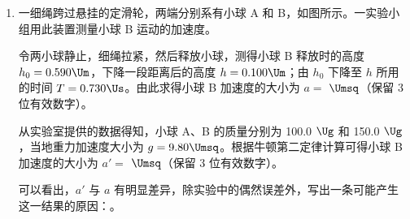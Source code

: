 \documentclass[\gkver]{gaokaozhenti}
\begin{document}
\begin{enumerate}
{$mv_{1}+m_{0}v_{0}=mv_{2}-m_{0}v_{0}$

解得 $v_{2}=\frac{3m_{0}}{m}v_{0}$

第 3 次推出后

$mv_{2}+m_{0}v_{0}=mv_{3}-m_{0}v_{0}$

解得 $v_{3}=\frac{5m_{0}}{m}v_{0}$

依次类推，第 8 次推出后，运动员的速度 $v_{8}=\frac{15m_{0}}{m}v_{0}$

根据题意可知 $v_{8}=\frac{15m_{0}}{m}v_{0}>5\Ums$

解得 $m<60\Ukg$

第 7 次运动员的速度一定小于 $5\Ums$，则 $v_{7}=\frac{13m_{0}}{m}v_{0}<5\Ums$，解得 $m>52\Ukg$。

综上所述，运动员的质量满足 $52\Ukg<m<60\Ukg$，AD 错误，BC 正确。

故选 BC。
}

\item
一细绳跨过悬挂的定滑轮，两端分别系有小球 A 和 B，如图所示。一实验小组用此装置测量小球 B 运动的加速度。

令两小球静止，细绳拉紧，然后释放小球，测得小球 B 释放时的高度 $h_{0}=0.590\Um$，下降一段距离后的高度 $h=0.100\Um$；由 $h_{0}$ 下降至 $h$ 所用的时间 $T=0.730\Us$。由此求得小球 B 加速度的大小为 $a=$ $\Umsq$（保留 3 位有效数字）。

从实验室提供的数据得知，小球 A、B 的质量分别为 100.0 $\Ug$ 和 150.0 $\Ug$，当地重力加速度大小为 $g=9.80\Umsq$。根据牛顿第二定律计算可得小球 B 加速度的大小为 $a'=$ $\Umsq$（保留 3 位有效数字）。

可以看出，$a'$ 与 $a$ 有明显差异，除实验中的偶然误差外，写出一条可能产生这一结果的原因：。

\onepicture[h=3.72cm]{}
\end{enumerate}
\end{document}
